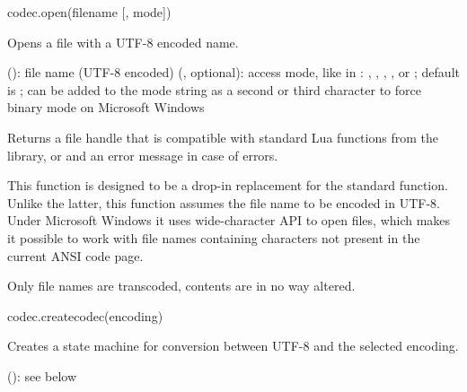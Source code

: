 \documentclass[a4paper,12pt,twoside,extrafontsizes]{memoir}
\begin{document}

\begin{luafuncprototype}
codec.open(filename [, mode])
\end{luafuncprototype}

\begin{funcdescr}
	Opens a file with a UTF-8 encoded name.
\end{funcdescr}

\begin{funcparams}
	 (): file name (UTF-8 encoded)
	 (, optional): access mode, like in : , , , ,  or ; default is ;  can be added to the mode string as a second or third character to force binary mode on Microsoft Windows
\end{funcparams}

\begin{funcret}
	Returns a file handle that is compatible with standard Lua functions from the  library, or  and an error message in case of errors.
\end{funcret}

\begin{funcremarks}
	This function is designed to be a drop-in replacement for the standard  function. Unlike the latter, this function assumes the file name to be encoded in UTF-8. Under Microsoft Windows it uses wide-character API to open files, which makes it possible to work with file names containing characters not present in the current ANSI code page.
	
	Only file names are transcoded, contents are in no way altered.
\end{funcremarks}


\begin{luafuncprototype}
codec.createcodec(encoding)
\end{luafuncprototype}

\begin{funcdescr}
	Creates a state machine for conversion between UTF-8 and the selected encoding.
\end{funcdescr}

\begin{funcparams}
	 (): see below
\end{funcparams}
\end{document}
